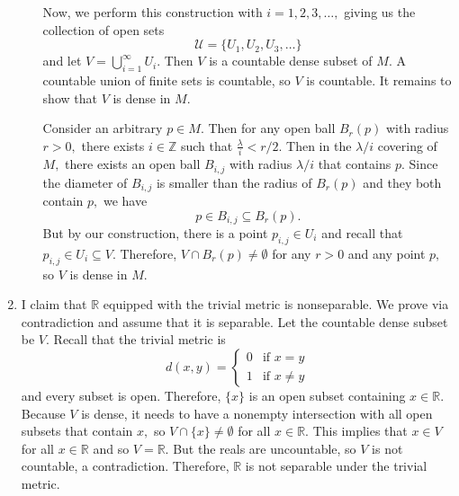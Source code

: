 \documentclass{article}
\numberwithin{equation}{section}
\begin{document}
\begin{enumerate}
\begin{enumerate}
        Now, we perform this construction with $i=1,2,3,\dots,$ giving us the collection of open sets 
        \begin{equation}
            \mathcal{U} = \{U_1,U_2,U_3,\dots\}
        \end{equation}
        and let $V = \bigcup_{i=1}^{\infty} U_i.$ Then $V$ is a countable dense subset of $M.$ A countable union of finite sets is countable, so $V$ is countable. It remains to show that $V$ is dense in $M.$

        Consider an arbitrary $p\in M.$ Then for any open ball $B_r(p)$ with radius $r>0,$ there exists $i\in \mathbb{Z}$ such that $\frac{\lambda}{i} < r/2.$ Then in the $\lambda/i$ covering of $M,$ there exists an open ball $B_{i,j}$ with radius $\lambda/i$ that contains $p.$ Since the diameter of $B_{i,j}$ is smaller than the radius of $B_{r}(p)$ and they both contain $p,$ we have 
        \begin{equation}
            p \in B_{i,j} \subseteq B_r(p).
        \end{equation}
        But by our construction, there is a point $p_{i,j}\in U_i$ and recall that $p_{i,j}\in U_i \subseteq V.$ Therefore, $V \cap B_r(p) \neq \emptyset$ for any $r>0$ and any point $p,$ so $V$ is dense in $M.$
    \end{enumerate}
    \newpage
    \item I claim that $\mathbb{R}$ equipped with the trivial metric is nonseparable. We prove via contradiction and assume that it is separable. Let the countable dense subset be $V.$ Recall that the trivial metric is 
    \begin{equation}
        d(x,y) = \begin{cases}
            0 & \text{if } x=y\\
            1 & \text{if } x\neq y
        \end{cases}
    \end{equation}
    and every subset is open. Therefore, $\{x\}$ is an open subset containing $x\in \mathbb{R}.$ Because $V$ is dense, it needs to have a nonempty intersection with all open subsets that contain $x,$ so $V \cap \{x\} \neq \emptyset$ for all $x\in \mathbb{R}.$ This implies that $x\in V$ for all $x\in \mathbb{R}$ and so $V=\mathbb{R}.$ But the reals are uncountable, so $V$ is not countable, a contradiction. Therefore, $\mathbb{R}$ is not separable under the trivial metric.
    \newpage
\end{enumerate}
\end{document}

